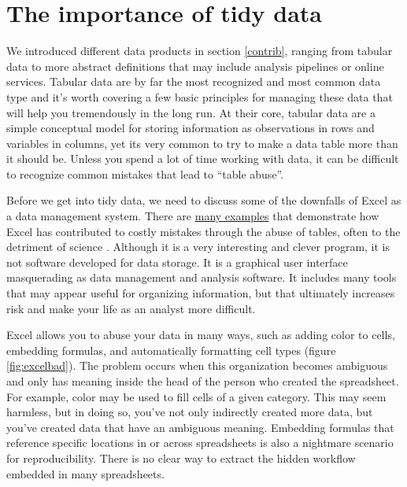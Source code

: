 \documentclass[
]{book}
\begin{document}
\hypertarget{whytidy}{%
\section{The importance of tidy data}\label{whytidy}}

We introduced different data products in section \ref{contrib}, ranging from tabular data to more abstract definitions that may include analysis pipelines or online services. Tabular data are by far the most recognized and most common data type and it's worth covering a few basic principles for managing these data that will help you tremendously in the long run. At their core, tabular data are a simple conceptual model for storing information as observations in rows and variables in columns, yet its very common to try to make a data table more than it should be. Unless you spend a lot of time working with data, it can be difficult to recognize common mistakes that lead to ``table abuse''.

Before we get into tidy data, we need to discuss some of the downfalls of Excel as a data management system. There are \href{http://www.eusprig.org/horror-stories.htm}{many examples} that demonstrate how Excel has contributed to costly mistakes through the abuse of tables, often to the detriment of science \citep{Ziemann16}. Although it is a very interesting and clever program, it is not software developed for data storage. It is a graphical user interface masquerading as data management and analysis software. It includes many tools that may appear useful for organizing information, but that ultimately increases risk and make your life as an analyst more difficult.

Excel allows you to abuse your data in many ways, such as adding color to cells, embedding formulas, and automatically formatting cell types (figure \ref{fig:excelbad}). The problem occurs when this organization becomes ambiguous and only has meaning inside the head of the person who created the spreadsheet. For example, color may be used to fill cells of a given category. This may seem harmless, but in doing so, you've not only indirectly created more data, but you've created data that have an ambiguous meaning. Embedding formulas that reference specific locations in or across spreadsheets is also a nightmare scenario for reproducibility. There is no clear way to extract the hidden workflow embedded in many spreadsheets.
\end{document}
